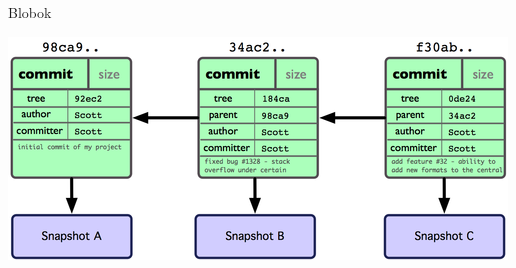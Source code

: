
\begin{frame}{Blobok}
    \begin{center}
        \includegraphics{frames/diagrams/refs.png}
    \end{center}
\end{frame}

